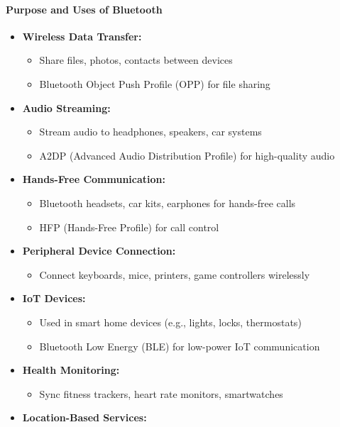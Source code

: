 \paragraph{Purpose and Uses of Bluetooth}
\begin{itemize}
    \item \textbf{Wireless Data Transfer:}
    \begin{itemize}
        \item Share files, photos, contacts between devices
        \item Bluetooth Object Push Profile (OPP) for file sharing
    \end{itemize}
    \item \textbf{Audio Streaming:}
    \begin{itemize}
        \item Stream audio to headphones, speakers, car systems
        \item A2DP (Advanced Audio Distribution Profile) for high-quality audio
    \end{itemize}
    \item \textbf{Hands-Free Communication:} 
    \begin{itemize}
        \item Bluetooth headsets, car kits, earphones for hands-free calls
        \item HFP (Hands-Free Profile) for call control
    \end{itemize}
    \item \textbf{Peripheral Device Connection:} 
    \begin{itemize}
        \item Connect keyboards, mice, printers, game controllers wirelessly
    \end{itemize}
    \item \textbf{IoT Devices:}
    \begin{itemize}
        \item Used in smart home devices (e.g., lights, locks, thermostats)
        \item Bluetooth Low Energy (BLE) for low-power IoT communication
    \end{itemize}
    \item \textbf{Health Monitoring:}
    \begin{itemize}
        \item Sync fitness trackers, heart rate monitors, smartwatches
    \end{itemize}
    \item \textbf{Location-Based Services:}

\end{itemize}
